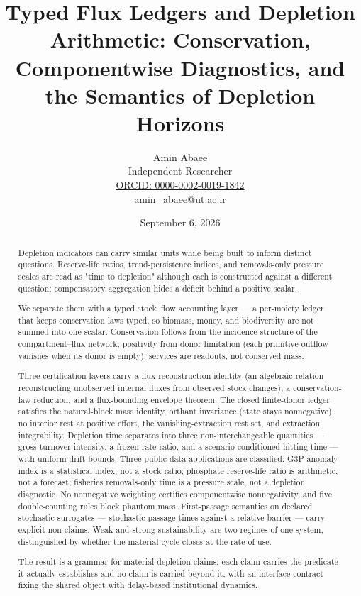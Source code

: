 \documentclass[11pt]{article}
\begin{document}
\title{Typed Flux Ledgers and Depletion Arithmetic: Conservation, Componentwise Diagnostics, and the Semantics of Depletion Horizons}
\author{Amin Abaee\\[0.35em]
{\small Independent Researcher}\\[0.55em]
{\small\href{https://orcid.org/\allowbreak{}0000-0002-0019-1842}{ORCID: 0000-0002-0019-1842}}\\[0.3em]
{\small\href{mailto:amin\_abaee@ut.ac.ir}{amin\_abaee@ut.ac.ir}}}
\date{September 6, 2026}
\maketitle

\begin{abstract}


Depletion indicators can carry similar units while being built to inform distinct questions. Reserve-life ratios, trend-persistence indices, and removals-only pressure scales are read as "time to depletion" although each is constructed against a different question; compensatory aggregation hides a deficit behind a positive scalar.

We separate them with a typed stock--flow accounting layer --- a
per-moiety ledger that keeps conservation laws typed, so biomass, money,
and biodiversity are not summed into one scalar. Conservation follows
from the incidence structure of the compartment--flux network;
positivity from donor limitation (each primitive outflow vanishes when
its donor is empty); services are readouts, not conserved mass.

Three certification layers carry a flux-reconstruction identity (an
algebraic relation reconstructing unobserved internal fluxes from
observed stock changes), a conservation-law reduction, and a
flux-bounding envelope theorem. The closed finite-donor ledger satisfies
the natural-block mass identity, orthant invariance (state stays
nonnegative), no interior rest at positive effort, the
vanishing-extraction rest set, and extraction integrability. Depletion
time separates into three non-interchangeable quantities --- gross
turnover intensity, a frozen-rate ratio, and a scenario-conditioned
hitting time --- with uniform-drift bounds. Three public-data
applications are classified: G3P anomaly index is a statistical index,
not a stock ratio; phosphate reserve-life ratio is arithmetic, not a
forecast; fisheries removals-only time is a pressure scale, not a
depletion diagnostic. No nonnegative weighting certifies componentwise
nonnegativity, and five double-counting rules block phantom mass.
First-passage semantics on declared stochastic surrogates --- stochastic
passage times against a relative barrier --- carry explicit non-claims.
Weak and strong sustainability are two regimes of one system,
distinguished by whether the material cycle closes at the rate of use.

The result is a grammar for material depletion claims: each claim carries the predicate it actually establishes and no claim is carried beyond it, with an interface contract fixing the shared object with delay-based institutional dynamics.

\end{abstract}
\end{document}
